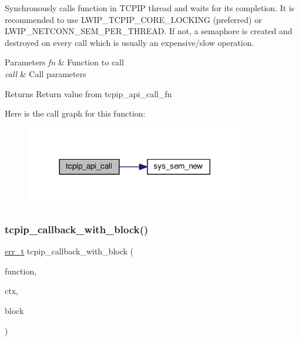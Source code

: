 Synchronously calls function in T\+C\+P\+IP thread and waits for its completion. It is recommended to use L\+W\+I\+P\+\_\+\+T\+C\+P\+I\+P\+\_\+\+C\+O\+R\+E\+\_\+\+L\+O\+C\+K\+I\+NG (preferred) or L\+W\+I\+P\+\_\+\+N\+E\+T\+C\+O\+N\+N\+\_\+\+S\+E\+M\+\_\+\+P\+E\+R\+\_\+\+T\+H\+R\+E\+AD. If not, a semaphore is created and destroyed on every call which is usually an expensive/slow operation. 
\begin{DoxyParams}{Parameters}
{\em fn} & Function to call \\
\hline
{\em call} & Call parameters \\
\hline
\end{DoxyParams}
\begin{DoxyReturn}{Returns}
Return value from tcpip\+\_\+api\+\_\+call\+\_\+fn 
\end{DoxyReturn}
Here is the call graph for this function\+:
\nopagebreak
\begin{figure}[H]
\begin{center}
\leavevmode
\includegraphics[width=272pt]{openmote-cc2538_2lwip_2src_2api_2tcpip_8c_a3d42b0c46607f91aedcc7745ed466b08_cgraph}
\end{center}
\end{figure}
\mbox{\label{openmote-cc2538_2lwip_2src_2api_2tcpip_8c_ab1d3ef23817d7703fa75ed67bd45ea1d}} 
\subsubsection{\texorpdfstring{tcpip\+\_\+callback\+\_\+with\+\_\+block()}{tcpip\_callback\_with\_block()}}
{\footnotesize\ttfamily \hyperlink{group__infrastructure__errors_gaf02d9da80fd66b4f986d2c53d7231ddb}{err\+\_\+t} tcpip\+\_\+callback\+\_\+with\+\_\+block (\begin{DoxyParamCaption}\item[{\hyperlink{openmote-cc2538_2lwip_2src_2include_2lwip_2tcpip_8h_a35203296bb838f3b493839ffc6e7285d}{tcpip\+\_\+callback\+\_\+fn}}]{function,  }\item[{void $\ast$}]{ctx,  }\item[{\hyperlink{group__compiler__abstraction_ga4caecabca98b43919dd11be1c0d4cd8e}{u8\+\_\+t}}]{block }\end{DoxyParamCaption})}

